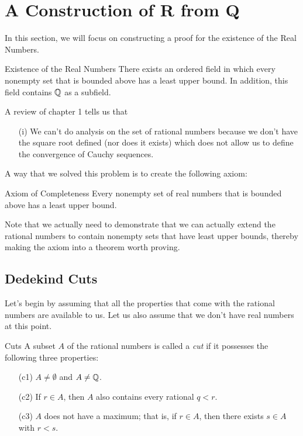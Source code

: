 \section{A Construction of R from Q}

In this section, we will focus on constructing a proof for the existence of the Real Numbers.

\begin{theorem}{Existence of the Real Numbers}{}
   There exists an ordered field in which every nonempty set that is bounded above has a least upper bound. In addition, this field contains \( \mathbb{Q}  \) as a subfield. 
\end{theorem}

A review of chapter 1 tells us that 
\begin{enumerate}
    \item[(i)] We can't do analysis on the set of rational numbers because we don't have the square root defined (nor does it exists) which does not allow us to define the convergence of Cauchy sequences.  
\end{enumerate}

A way that we solved this problem is to create the following axiom:

\begin{axiom}{Axiom of Completeness}{}
   Every nonempty set of real numbers that is bounded above has a least upper bound. 
\end{axiom}

Note that we actually need to demonstrate that we can actually extend the rational numbers to contain nonempty sets that have least upper bounds, thereby making the axiom into a theorem worth proving.


\subsection{Dedekind Cuts}

Let's begin by assuming that all the properties that come with the rational numbers are available to us. Let us also assume that we don't have real numbers at this point.

\begin{definition}{Cuts}{}
    A subset \( A  \) of the rational numbers is called a \textit{cut} if it possesses the following three properties: 
    \begin{enumerate}
        \item[(c1)] \( A \neq \emptyset \) and \( A \neq \mathbb{Q}  \). 
        \item[(c2)] If \( r \in A  \), then \( A  \) also contains every rational \( q <  r  \).
        \item[(c3)] \( A  \) does not have a maximum; that is, if \(  r \in A  \), then there exists \( s \in A  \) with \( r < s  \). 
    \end{enumerate}
\end{definition}

